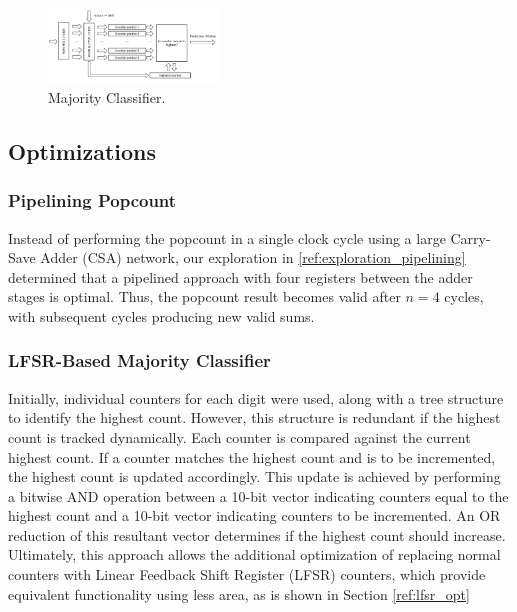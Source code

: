 \documentclass[conference]{IEEEtran}
\begin{document}
\begin{figure}[h]
    \centering
    \includegraphics[width=0.4\textwidth]{majority_classifier.pdf}
    \caption{Majority Classifier.}
    \label{fig:majority_classifier}
\end{figure}



\subsection{Optimizations}
\subsubsection{Pipelining Popcount}
\label{ref:pipeline_popcount}

Instead of performing the popcount in a single clock cycle using a large Carry-Save Adder (CSA) network, our exploration in \autoref{ref:exploration_pipelining} determined that a pipelined approach with four registers between the adder stages is optimal. Thus, the popcount result becomes valid after $n=4$ cycles, with subsequent cycles producing new valid sums.

\subsubsection{LFSR-Based Majority Classifier}

Initially, individual counters for each digit were used, along with a tree structure to identify the highest count. However, this structure is redundant if the highest count is tracked dynamically. Each counter is compared against the current highest count. If a counter matches the highest count and is to be incremented, the highest count is updated accordingly. This update is achieved by performing a bitwise AND operation between a 10-bit vector indicating counters equal to the highest count and a 10-bit vector indicating counters to be incremented. An OR reduction of this resultant vector determines if the highest count should increase. 
Ultimately, this approach allows the additional optimization of replacing normal counters with Linear Feedback Shift Register (LFSR) counters, which provide equivalent functionality using less area, as is shown in Section \ref{ref:lfsr_opt}
\end{document}

